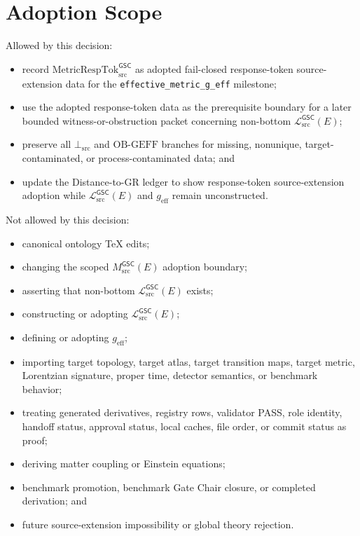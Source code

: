 \documentclass[11pt]{article}
\newcommand{\MsrcGSC}{M_{\mathrm{src}}^{\mathsf{GSC}}}
\newcommand{\MetricRespTok}{\mathrm{MetricRespTok}_{\mathrm{src}}^{\mathsf{GSC}}}
\newcommand{\MetricData}{\mathcal{L}_{\mathrm{src}}^{\mathsf{GSC}}}
\newcommand{\BottomSrc}{\bot_{\mathrm{src}}}
\newcommand{\OBGEFF}{\mathrm{OB\mbox{-}GEFF}}
\newcommand{\geff}{g_{\mathrm{eff}}}
\begin{document}
\section{Adoption Scope}

Allowed by this decision:
\begin{itemize}[leftmargin=*]
  \item record \(\MetricRespTok\) as adopted fail-closed response-token
  source-extension data for the \texttt{effective\_metric\_g\_eff} milestone;
  \item use the adopted response-token data as the prerequisite boundary for a
  later bounded witness-or-obstruction packet concerning non-bottom
  \(\MetricData(E)\);
  \item preserve all \(\BottomSrc\) and \(\OBGEFF\) branches for missing,
  nonunique, target-contaminated, or process-contaminated data; and
  \item update the Distance-to-GR ledger to show response-token
  source-extension adoption while \(\MetricData(E)\) and \(\geff\) remain
  unconstructed.
\end{itemize}

Not allowed by this decision:
\begin{itemize}[leftmargin=*]
  \item canonical ontology TeX edits;
  \item changing the scoped \(\MsrcGSC(E)\) adoption boundary;
  \item asserting that non-bottom \(\MetricData(E)\) exists;
  \item constructing or adopting \(\MetricData(E)\);
  \item defining or adopting \(\geff\);
  \item importing target topology, target atlas, target transition maps,
  target metric, Lorentzian signature, proper time, detector semantics, or
  benchmark behavior;
  \item treating generated derivatives, registry rows, validator PASS, role
  identity, handoff status, approval status, local caches, file order, or
  commit status as proof;
  \item deriving matter coupling or Einstein equations;
  \item benchmark promotion, benchmark Gate Chair closure, or completed
  derivation; and
  \item future source-extension impossibility or global theory rejection.
\end{itemize}
\end{document}
